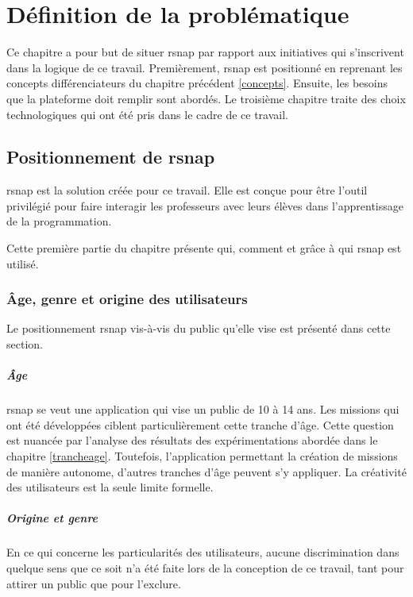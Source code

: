 \chapter{Définition de la problématique}
Ce chapitre a pour but de situer \gls{rsnap} par rapport aux initiatives qui s'inscrivent dans la logique de ce travail. Premièrement, \gls{rsnap} est positionné en reprenant les concepts différenciateurs du chapitre précédent \ref{concepts}. Ensuite, les besoins que la plateforme doit remplir sont abordés. Le troisième chapitre traite des choix technologiques qui ont été pris dans le cadre de ce travail.

\section{Positionnement de \gls{rsnap}}
\label{positionnement}
\gls{rsnap} est la solution créée pour ce travail. Elle est conçue pour être l'outil privilégié pour faire interagir les professeurs avec leurs élèves dans l'apprentissage de la programmation.

Cette première partie du chapitre présente qui, comment et grâce à qui \gls{rsnap} est utilisé.

\subsection{Âge, genre et origine des utilisateurs}
Le positionnement \gls{rsnap} vis-à-vis du public qu'elle vise est présenté dans cette section.

\paragraph{Âge}
\gls{rsnap} se veut une application qui vise un public de 10 à 14 ans. Les \glspl{mission} qui ont été développées ciblent particulièrement cette tranche d'âge. Cette question est nuancée par l'analyse des résultats des expérimentations abordée dans le chapitre \ref{trancheage}.
Toutefois, l'application permettant la création de \glspl{mission} de manière autonome, d'autres tranches d'âge peuvent s'y appliquer. La créativité des utilisateurs est la seule limite formelle.

\paragraph{Origine et genre}
En ce qui concerne les particularités des utilisateurs, aucune discrimination dans quelque sens que ce soit n'a été faite lors de la conception de ce travail, tant pour attirer un public que pour l'exclure.

